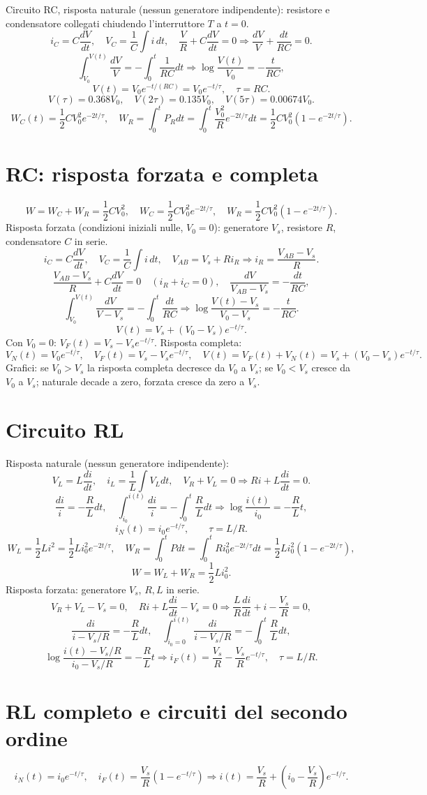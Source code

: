 \documentclass[11pt,a4paper]{article}
\newcommand{\pagina}[2]{\clearpage\section*{#2}}
\begin{document}
Circuito RC, risposta naturale (nessun generatore indipendente): resistore e condensatore collegati chiudendo l'interruttore $T$ a $t=0$.
\[i_C=C\frac{dV}{dt},\quad V_C=\frac1C\int i\,dt,\quad \frac VR+C\frac{dV}{dt}=0\Rightarrow\frac{dV}{V}+\frac{dt}{RC}=0.\]
\[\int_{V_0}^{V(t)}\frac{dV}{V}=-\int_0^t\frac1{RC}dt\Rightarrow\log\frac{V(t)}{V_0}=-\frac t{RC},\]
\[V(t)=V_0e^{-t/(RC)}=V_0e^{-t/\tau},\quad\tau=RC.\]
\[V(\tau)=0.368V_0,\quad V(2\tau)=0.135V_0,\quad V(5\tau)=0.00674V_0.\]
\[W_C(t)=\frac12CV_0^2e^{-2t/\tau},\quad W_R=\int_0^tP_Rdt=\int_0^t\frac{V_0^2}{R}e^{-2t/\tau}dt=\frac12CV_0^2(1-e^{-2t/\tau}).\]
\pagina{19}{RC: risposta forzata e completa}
\[W=W_C+W_R=\frac12CV_0^2,\quad W_C=\frac12CV_0^2e^{-2t/\tau},\quad W_R=\frac12CV_0^2(1-e^{-2t/\tau}).\]
Risposta forzata (condizioni iniziali nulle, $V_0=0$): generatore $V_s$, resistore $R$, condensatore $C$ in serie.
\[i_C=C\frac{dV}{dt},\quad V_C=\frac1C\int i\,dt,\quad V_{AB}=V_s+Ri_R\Rightarrow i_R=\frac{V_{AB}-V_s}{R}.\]
\[\frac{V_{AB}-V_s}{R}+C\frac{dV}{dt}=0\quad(i_R+i_C=0),\quad\frac{dV}{V_{AB}-V_s}=-\frac{dt}{RC},\]
\[\int_{V_0}^{V(t)}\frac{dV}{V-V_s}=-\int_0^t\frac{dt}{RC}\Rightarrow\log\frac{V(t)-V_s}{V_0-V_s}=-\frac t{RC}.\]
\[V(t)=V_s+(V_0-V_s)e^{-t/\tau}.\]
Con $V_0=0$: $V_F(t)=V_s-V_se^{-t/\tau}$. Risposta completa:
\[V_N(t)=V_0e^{-t/\tau},\quad V_F(t)=V_s-V_se^{-t/\tau},\quad V(t)=V_F(t)+V_N(t)=V_s+(V_0-V_s)e^{-t/\tau}.\]
Grafici: se $V_0>V_s$ la risposta completa decresce da $V_0$ a $V_s$; se $V_0<V_s$ cresce da $V_0$ a $V_s$; naturale decade a zero, forzata cresce da zero a $V_s$.
\pagina{20}{Circuito RL}
Risposta naturale (nessun generatore indipendente):
\[V_L=L\frac{di}{dt},\quad i_L=\frac1L\int V_Ldt,\quad V_R+V_L=0\Rightarrow Ri+L\frac{di}{dt}=0.\]
\[\frac{di}{i}=-\frac RLdt,\quad\int_{i_0}^{i(t)}\frac{di}{i}=-\int_0^t\frac RLdt\Rightarrow\log\frac{i(t)}{i_0}=-\frac RLt,\]
\[i_N(t)=i_0e^{-t/\tau},\qquad\tau=L/R.\]
\[W_L=\frac12Li^2=\frac12Li_0^2e^{-2t/\tau},\quad W_R=\int_0^tPdt=\int_0^tRi_0^2e^{-2t/\tau}dt=\frac12Li_0^2(1-e^{-2t/\tau}),\]
\[W=W_L+W_R=\frac12Li_0^2.\]
Risposta forzata: generatore $V_s$, $R,L$ in serie.
\[V_R+V_L-V_s=0,\quad Ri+L\frac{di}{dt}-V_s=0\Rightarrow\frac LR\frac{di}{dt}+i-\frac{V_s}{R}=0,\]
\[\frac{di}{i-V_s/R}=-\frac RLdt,\quad\int_{i_0=0}^{i(t)}\frac{di}{i-V_s/R}=-\int_0^t\frac RLdt,\]
\[\log\frac{i(t)-V_s/R}{i_0-V_s/R}=-\frac RLt\Rightarrow i_F(t)=\frac{V_s}{R}-\frac{V_s}{R}e^{-t/\tau},\quad\tau=L/R.\]
\pagina{21}{RL completo e circuiti del secondo ordine}
\[i_N(t)=i_0e^{-t/\tau},\quad i_F(t)=\frac{V_s}{R}(1-e^{-t/\tau})\Rightarrow i(t)=\frac{V_s}{R}+\left(i_0-\frac{V_s}{R}\right)e^{-t/\tau}.\]
\end{document}
